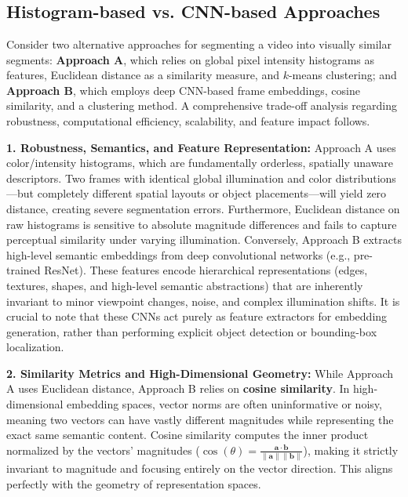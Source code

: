 
\section[Question -- {\it Video Segmentation Trade-offs}]{}

\subsection{Histogram-based vs. CNN-based Approaches}
Consider two alternative approaches for segmenting a video into visually similar segments: \textbf{Approach A}, which relies on global pixel intensity histograms as features, Euclidean distance as a similarity measure, and $k$-means clustering; and \textbf{Approach B}, which employs deep CNN-based frame embeddings, cosine similarity, and a clustering method. A comprehensive trade-off analysis regarding robustness, computational efficiency, scalability, and feature impact follows.

\textbf{1. Robustness, Semantics, and Feature Representation:}
Approach A uses color/intensity histograms, which are fundamentally orderless, spatially unaware descriptors. Two frames with identical global illumination and color distributions—but completely different spatial layouts or object placements—will yield zero distance, creating severe segmentation errors. Furthermore, Euclidean distance on raw histograms is sensitive to absolute magnitude differences and fails to capture perceptual similarity under varying illumination. 
Conversely, Approach B extracts high-level semantic embeddings from deep convolutional networks (e.g., pre-trained ResNet). These features encode hierarchical representations (edges, textures, shapes, and high-level semantic abstractions) that are inherently invariant to minor viewpoint changes, noise, and complex illumination shifts. It is crucial to note that these CNNs act purely as feature extractors for embedding generation, rather than performing explicit object detection or bounding-box localization.

\textbf{2. Similarity Metrics and High-Dimensional Geometry:}
While Approach A uses Euclidean distance, Approach B relies on \textbf{cosine similarity}. In high-dimensional embedding spaces, vector norms are often uninformative or noisy, meaning two vectors can have vastly different magnitudes while representing the exact same semantic content. Cosine similarity computes the inner product normalized by the vectors' magnitudes ($\cos(\theta) = \frac{\mathbf{a} \cdot \mathbf{b}}{\|\mathbf{a}\| \|\mathbf{b}\|}$), making it strictly invariant to magnitude and focusing entirely on the vector direction. This aligns perfectly with the geometry of representation spaces.

